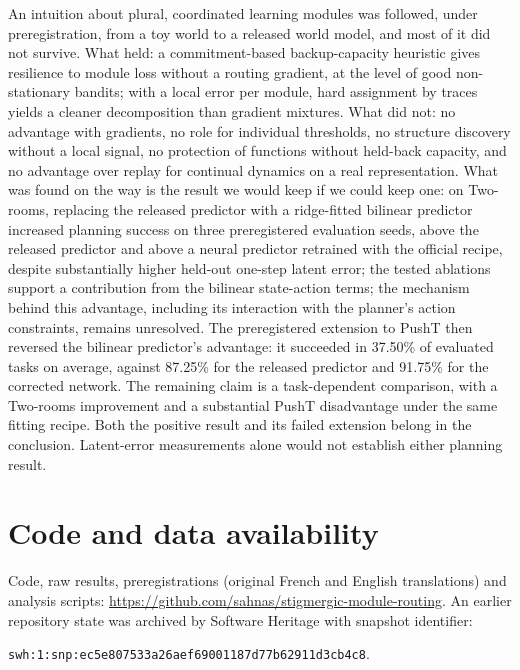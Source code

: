 \documentclass[11pt,a4paper]{article}
\begin{document}
An intuition about plural, coordinated learning modules was followed, under preregistration, from a toy world to a released world model, and most of it did not survive. What held: a commitment-based backup-capacity heuristic gives resilience to module loss without a routing gradient, at the level of good non-stationary bandits; with a local error per module, hard assignment by traces yields a cleaner decomposition than gradient mixtures. What did not: no advantage with gradients, no role for individual thresholds, no structure discovery without a local signal, no protection of functions without held-back capacity, and no advantage over replay for continual dynamics on a real representation. What was found on the way is the result we would keep if we could keep one: on Two-rooms, replacing the released predictor with a ridge-fitted bilinear predictor increased planning success on three preregistered evaluation seeds, above the released predictor and above a neural predictor retrained with the official recipe, despite substantially higher held-out one-step latent error; the tested ablations support a contribution from the bilinear state-action terms; the mechanism behind this advantage, including its interaction with the planner's action constraints, remains unresolved. The preregistered extension to PushT then reversed the bilinear predictor's advantage: it succeeded in 37.50\% of evaluated tasks on average, against 87.25\% for the released predictor and 91.75\% for the corrected network. The remaining claim is a task-dependent comparison, with a Two-rooms improvement and a substantial PushT disadvantage under the same fitting recipe. Both the positive result and its failed extension belong in the conclusion. Latent-error measurements alone would not establish either planning result.

\section*{Code and data availability}
Code, raw results, preregistrations (original French and English translations) and analysis scripts: \url{https://github.com/sahnas/stigmergic-module-routing}. An earlier repository state was archived by Software Heritage with snapshot identifier:\par\noindent\texttt{swh:1:snp:ec5e807533a26aef69001187d77b62911d3cb4c8}.
\end{document}
